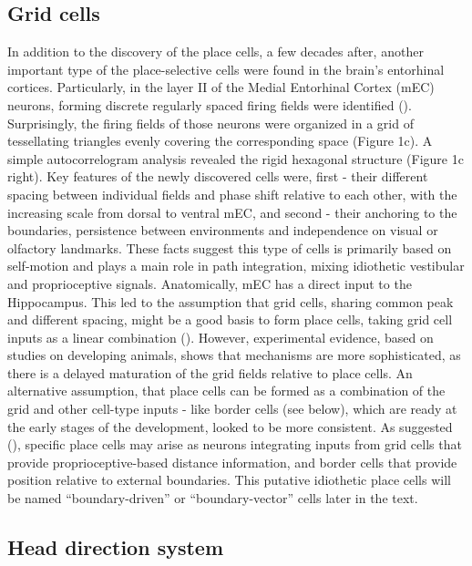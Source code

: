 \subsection{Grid cells}

In addition to the discovery of the place cells, a few decades after, another important type of the place-selective cells were found in the brain’s entorhinal cortices. Particularly, in the layer II of the Medial Entorhinal Cortex (mEC) neurons, forming discrete regularly spaced firing fields were identified (\cite{Hafting2005}). Surprisingly, the firing fields of those neurons were organized in a grid of tessellating triangles evenly covering the corresponding space (Figure 1c). A simple autocorrelogram analysis revealed the rigid hexagonal structure (Figure 1c right). Key features of the newly discovered cells were, first - their different spacing between individual fields and phase shift relative to each other, with the increasing scale from dorsal to ventral mEC, and second - their anchoring to the boundaries, persistence between environments and independence on visual or olfactory landmarks. These facts suggest this type of cells is primarily based on self-motion and plays a main role in path integration, mixing idiothetic vestibular and proprioceptive signals.
Anatomically, mEC has a direct input to the Hippocampus. This led to the assumption that grid cells, sharing common peak and different spacing, might be a good basis to form place cells, taking grid cell inputs as a linear combination (\cite{OKeefe2005}). However, experimental evidence, based on studies on developing animals, shows that mechanisms are more sophisticated, as there is a delayed maturation of the grid fields relative to place cells. An alternative assumption, that place cells can be formed as a combination of the grid and other cell-type inputs - like border cells (see below), which are ready at the early stages of the development, looked to be more consistent. As suggested (\cite{Savelli2008}), specific place cells may arise as neurons integrating inputs from grid cells that provide proprioceptive-based distance information, and border cells that provide position relative to external boundaries. This putative idiothetic place cells will be named “boundary-driven” or “boundary-vector” cells later in the text.


\subsection{Head direction system}

